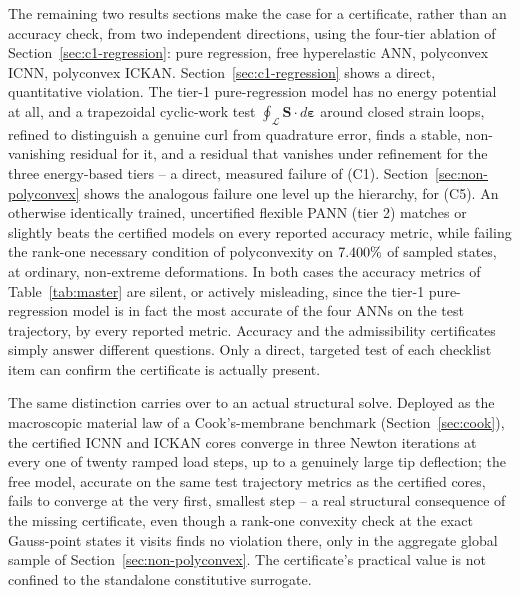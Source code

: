 \documentclass[10pt,a4paper]{article}
\begin{document}
The remaining two results sections make the case for a certificate,
rather than an accuracy check, from two independent directions, using
the four-tier ablation of Section~\ref{sec:c1-regression}: pure
regression, free hyperelastic ANN, polyconvex ICNN, polyconvex ICKAN.
Section~\ref{sec:c1-regression} shows a direct, quantitative violation.
The tier-1 pure-regression model has no energy potential at all, and a
trapezoidal cyclic-work test $\oint_{\mathcal L}\bm S\cdot d\bm\varepsilon$
around closed strain loops, refined to distinguish a genuine curl from
quadrature error, finds a stable, non-vanishing residual for it, and a
residual that vanishes under refinement for the three energy-based
tiers -- a direct, measured failure of (C1). Section~\ref{sec:non-polyconvex}
shows the analogous failure one level up the hierarchy, for (C5). An
otherwise identically trained, uncertified flexible PANN (tier 2)
matches or slightly beats the certified models on every reported
accuracy metric, while failing the rank-one necessary condition of
polyconvexity on $7.400\%$ of sampled states, at
ordinary, non-extreme deformations. In both cases the accuracy metrics
of Table~\ref{tab:master} are silent, or actively misleading, since the tier-1
pure-regression model is in fact the most accurate of the four ANNs on
the test trajectory, by every reported metric. Accuracy and the
admissibility certificates simply answer different questions. Only a
direct, targeted test of each checklist item can confirm the certificate
is actually present.

The same distinction carries over to an actual structural solve.
Deployed as the macroscopic material law of a Cook's-membrane benchmark
(Section~\ref{sec:cook}), the certified ICNN and ICKAN cores converge in
three Newton iterations at every one of twenty ramped load steps, up to
a genuinely large tip deflection; the free model, accurate on the same
test trajectory metrics as the certified cores, fails to converge at
the very first, smallest step -- a real structural consequence of the
missing certificate, even though a rank-one convexity check at the
exact Gauss-point states it visits finds no violation there, only in
the aggregate global sample of Section~\ref{sec:non-polyconvex}.
The certificate's practical value is not confined to the standalone
constitutive surrogate.
\end{document}
